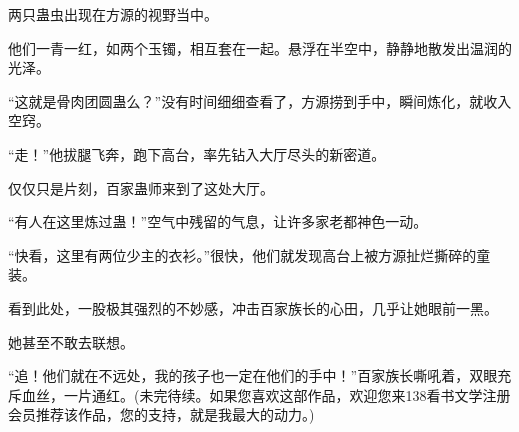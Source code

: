 \begin{this_body}
两只蛊虫出现在方源的视野当中。

他们一青一红，如两个玉镯，相互套在一起。悬浮在半空中，静静地散发出温润的光泽。

“这就是骨肉团圆蛊么？”没有时间细细查看了，方源捞到手中，瞬间炼化，就收入空窍。

“走！”他拔腿飞奔，跑下高台，率先钻入大厅尽头的新密道。

仅仅只是片刻，百家蛊师来到了这处大厅。

“有人在这里炼过蛊！”空气中残留的气息，让许多家老都神色一动。

“快看，这里有两位少主的衣衫。”很快，他们就发现高台上被方源扯烂撕碎的童装。

看到此处，一股极其强烈的不妙感，冲击百家族长的心田，几乎让她眼前一黑。

她甚至不敢去联想。

“追！他们就在不远处，我的孩子也一定在他们的手中！”百家族长嘶吼着，双眼充斥血丝，一片通红。(未完待续。如果您喜欢这部作品，欢迎您来138看书文学注册会员推荐该作品，您的支持，就是我最大的动力。)

\end{this_body}

